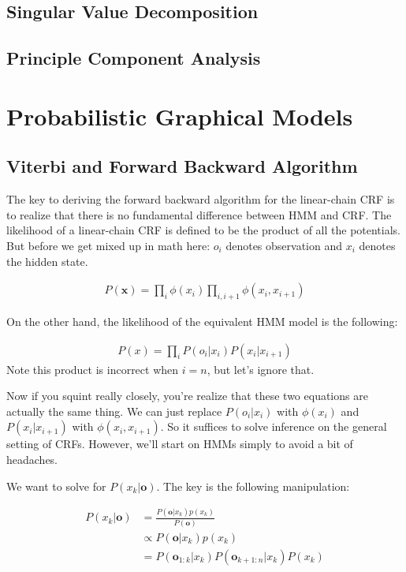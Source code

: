 \documentclass[12pt]{article}
\newcommand{\eq}[1]{\begin{align*}#1\end{align*}}
\begin{document}
\subsection{Singular Value Decomposition}

\subsection{Principle Component Analysis}

\section{Probabilistic Graphical Models}

\subsection{Viterbi and Forward Backward Algorithm}

\renewcommand{\o}{\mathbf{o}}
\newcommand{\x}{\mathbf{x}}

The key to deriving the forward backward algorithm for the linear-chain CRF is to realize that there is no fundamental difference between HMM and CRF.
The likelihood of a linear-chain CRF is defined to be the product of all the potentials. But before we get mixed up in math here: $o_i$ denotes observation and $x_i$ denotes the hidden state.

\eq{
P(\x) = \prod_i \phi(x_i) \prod_{i,i+1} \phi(x_i, x_{i+1})
}

On the other hand, the likelihood of the equivalent HMM model is the following:

\eq{
P(x) = \prod_i P(o_i | x_i) P(x_i | x_{i+1})
}
Note this product is incorrect when $i = n$, but let's ignore that.

Now if you squint really closely, you're realize that these two equations are actually the same thing. We can just replace $P(o_i|x_i)$ with $\phi(x_i)$ and $P(x_i|x_{i+1})$ with $\phi(x_i, x_{i+1})$. So it suffices to solve inference on the general setting of CRFs. However, we'll start on HMMs simply to avoid a bit of headaches.

We want to solve for $P(x_k|\o)$. The key is the following manipulation:


\eq{
  P(x_k|\o) &= \frac{P(\o|x_k)p(x_k)}{P(\o)} \\
  &\propto P(\o|x_k)p(x_k) \\
  &= P(\o_{1:k}|x_k)P(\o_{k+1:n}|x_k)P(x_k) \\
}
\end{document}
